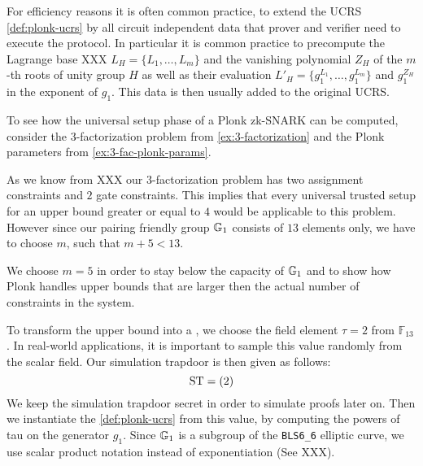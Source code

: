 For efficiency reasons it is often common practice, to extend the UCRS \ref{def:plonk-ucrs} by all circuit independent data that prover and verifier need to execute the protocol. In particular it is common practice to precompute the Lagrange base XXX $L_H= \{L_1,\ldots,L_m\}$ and the vanishing polynomial $Z_H$ of the $m$-th roots of unity group $H$ as well as their evaluation $L'_H= \{g_1^{L_1},\ldots,g_1^{L_m}\}$ and $g_1^{Z_H}$ in the exponent of $g_1$. This data is then usually added to the original UCRS.   
\begin{example}
\label{ex:3-fac-UCRS}
To see how the universal setup phase of a Plonk zk-SNARK can be computed, consider the $3$-factorization problem from \ref{ex:3-factorization} and the Plonk parameters from \examplename{} \ref{ex:3-fac-plonk-params}. 

As we know from XXX our $3$-factorization problem has two assignment constraints and $2$ gate constraints. This implies that every universal trusted setup for an upper bound greater or equal to $4$ would be applicable to this problem. However since our pairing friendly group $\mathbb{G}_1$ consists of $13$ elements only, we have to choose $m$, such that $m+5<13$. 

We choose $m=5$ in order to stay below the capacity of $\mathbb{G}_1$ and to show how Plonk handles upper bounds that are larger then the actual number of constraints in the system.

To transform the upper bound into a , we choose the  field element $\tau=2$ from $\mathbb{F}_{13}$. In real-world applications, it is important to sample this value randomly from the scalar field. Our simulation trapdoor is then given as follows:
$$
\mathrm{ST} = (2)
$$
We keep the simulation trapdoor secret in order to simulate proofs later on. Then we instantiate the  \ref{def:plonk-ucrs} from this value, by computing the powers of tau on the generator $g_1$. Since $\mathbb{G}_1$ is a subgroup of the \texttt{BLS6\_6} elliptic curve, we use scalar product notation instead of exponentiation (See XXX). 


\end{example}
